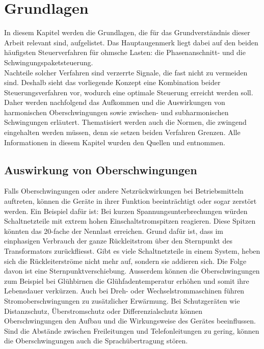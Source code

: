 \section{Grundlagen}
In diesem Kapitel werden die Grundlagen, die für das Grundverständnis dieser Arbeit relevant sind, aufgelistet. Das Hauptaugenmerk liegt dabei auf den beiden häufigsten Steuerverfahren für ohmsche Lasten: die Phasenanschnitt- und die Schwingungspaketsteuerung.\\
Nachteile solcher Verfahren sind verzerrte Signale, die fast nicht zu vermeiden sind. Deshalb sieht das vorliegende Konzept eine Kombination beider Steuerungsverfahren vor, wodurch eine optimale Steuerung erreicht werden soll. Daher werden nachfolgend das Aufkommen und die Auswirkungen von harmonischen Oberschwingungen sowie zwischen- und subharmonischen Schwingungen erläutert. Thematisiert werden auch die Normen, die zwingend eingehalten werden müssen, denn sie setzen beiden Verfahren Grenzen. Alle Informationen in diesem Kapitel wurden den Quellen \cite{Spannungsqualitaet} und \cite{Oberwellen2} entnommen.

\subsection{Auswirkung von Oberschwingungen}

Falls Oberschwingungen oder andere Netzrückwirkungen bei Betriebsmitteln auftreten, können die Geräte in ihrer Funktion beeinträchtigt oder sogar zerstört werden. Ein Beispiel dafür ist: Bei kurzen Spannungsunterbrechungen würden Schaltnetzteile mit extrem hohen Einschaltstromspitzen reagieren. Diese Spitzen könnten das 20-fache der Nennlast erreichen. Grund dafür ist, dass im einphasigen Verbrauch der ganze Rückleitstrom über den Sternpunkt des Transformators zurückfliesst. Gibt es viele Schaltnetzteile in einem System, heben sich die Rückleiterströme nicht mehr auf, sondern sie addieren sich. Die Folge davon ist eine Sternpunktverschiebung. Ausserdem können die Oberschwingungen zum Beispiel bei Glühbirnen die Glühfadentemperatur erhöhen und somit ihre Lebensdauer verkürzen. Auch bei Dreh- oder Wechselstrommaschinen führen Stromoberschwingungen zu zusätzlicher Erwärmung. Bei Schutzgeräten wie Distanzschutz, Überstromschutz oder Differenzialschutz können Oberschwingungen den Aufbau und die Wirkungsweise des Gerätes beeinflussen. Sind die Abstände zwischen Freileitungen und Telefonleitungen zu gering, können die Oberschwingungen auch die Sprachübertragung stören.



